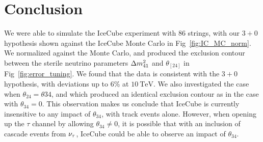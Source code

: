 \chapter{Conclusion}\label{ch:conc}
We were able to simulate the IceCube experiment with 86 strings, with our $3+0$ hypothesis shown against the IceCube Monte Carlo in Fig~\ref{fig:IC_MC_norm}. 
We normalized against the Monte Carlo, and produced the exclusion contour between the sterile neutrino parameters $\dm[41]$ and $\theta_[24]$ in Fig~\ref{fig:error_tuning}.
We found that the data is consistent with the $3+0$ hypothesis, with deviations up to 6\% at $\SI{10}{\TeV}$.
We also investigated the case when $\theta_{24} = \theta{34}$, and which produced an identical exclusion contour as in the case with $\theta_{34}=0$. This 
observation makes us conclude that IceCube is currently insensitive to any impact of $\theta_{34}$, with track events alone. However,
when opening up the $\tau$ channel by allowing $\theta_{34} \neq 0$, it is possible that with an inclusion of cascade events from $\nu_\tau$, IceCube could be able to observe 
an impact of $\theta_{34}$.


